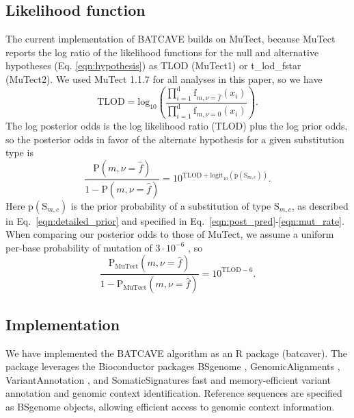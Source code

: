 \documentclass[a4,center,fleqn]{NAR}
\newcommand{\batcave}{BATCAVE\xspace}
\begin{document}
\subsection{Likelihood function}
The current implementation of \batcave builds on MuTect, because MuTect reports the log ratio of the likelihood functions for the null and alternative hypotheses (Eq. \ref{eqn:hypothesis}) as \textrm{TLOD} (MuTect1) or \textrm{t\_lod\_fstar} (MuTect2).
We used MuTect 1.1.7 for all analyses in this paper, so we have
\begin{equation}
  \label{eqn:tlod}
    \mathrm{TLOD} = \mathrm{log}_{10}\left(\frac{\prod_{i=1}^{\mathrm{d}} \textrm{f}_{m,\nu = \hat{f}}(x_i)}{\prod_{i=1}^{\mathrm{d}} \textrm{f}_{m,\nu = 0}(x_i)}\right).
\end{equation}
The log posterior odds is the log likelihood ratio (\textrm{TLOD}) plus the log prior odds, so the posterior odds in favor of the alternate hypothesis for a given substitution type is
\begin{equation}
  \label{eqn:computed_posterior}
  \frac{\mathrm{P}(m,\nu = \hat{f})}{1 - \mathrm{P}(m,\nu = \hat{f})} = 10^{\mathrm{TLOD} + \mathrm{logit}_{10}(\mathrm{p}(\mathrm{S}_{m,c}))}.
\end{equation}
Here $\mathrm{p}(\mathrm{S}_{m,c})$ is the prior probability of a substitution of type $\mathrm{S}_{m,c}$, as described in Eq.~\ref{eqn:detailed_prior} and specified in Eq.~\ref{eqn:post_pred}-\ref{eqn:mut_rate}.
When comparing our posterior odds to those of MuTect, we assume a uniform per-base probability of mutation of $3\cdot10^{-6}$ \cite{Cibulskis2013}, so
\begin{equation}  \label{eqn:mutect_posterior}
  \frac{\mathrm{P}_\mathrm{MuTect}(m,\nu = \hat{f})}{1 - \mathrm{P}_\mathrm{MuTect}(m,\nu = \hat{f})} = 10^{\mathrm{TLOD} - 6}.
\end{equation}

\subsection{Implementation}
We have implemented the \batcave algorithm as an R package (batcaver).
The package leverages the Bioconductor packages \textrm{BSgenome} \citep{Pages2019}, \textrm{GenomicAlignments} \citep{Lawrence2013}, \textrm{VariantAnnotation} \citep{Obenchain2014}, and \textrm{SomaticSignatures} \citep{Gehring2015} fast and memory-efficient variant annotation and genomic context identification.
Reference sequences are specified as BSgenome objects, allowing efficient access to genomic context information.
\end{document}
